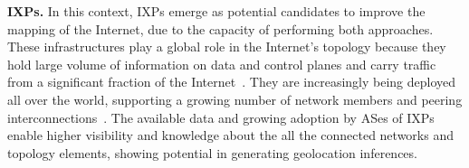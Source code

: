 
	\textbf{IXPs.} In this context, IXPs emerge as potential candidates to improve the mapping of the Internet, due to the capacity of performing both approaches. These infrastructures play a global role in the Internet’s topology because they hold large volume of information on data and control planes and carry traffic from a significant fraction of the Internet~\cite{Chatzis:2013:BUL:2504730.2504746}. They are increasingly being deployed all over the world, supporting a growing number of network members and peering interconnections~\cite{Giotsas:2017:DPI:3098822.3098855}. The available data and growing adoption by ASes of IXPs enable higher visibility and knowledge about the all the connected networks and topology elements, showing potential in generating geolocation inferences.
	


